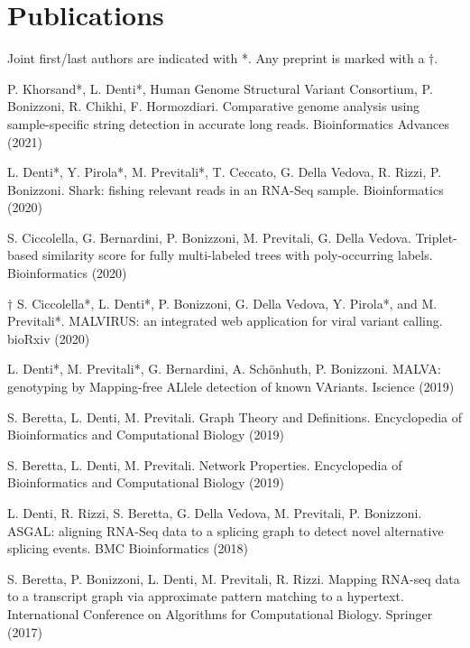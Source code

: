 \documentclass[letterpaper,11pt]{article}
\begin{document}
\section{Publications}
Joint first/last authors are indicated with *. Any preprint is marked with a \(\dagger\).
{\small
\begin{etaremune}
    \item P. Khorsand*, L. Denti*, Human Genome Structural Variant Consortium, P. Bonizzoni, R. Chikhi, F. Hormozdiari. Comparative genome analysis using sample-specific string detection in accurate long reads. Bioinformatics Advances (2021)

    \item L. Denti*, Y. Pirola*, M. Previtali*, T. Ceccato, G. Della Vedova, R. Rizzi, P. Bonizzoni. Shark: fishing relevant reads in an RNA-Seq sample. Bioinformatics (2020)
   
    \item S. Ciccolella, G. Bernardini, P. Bonizzoni, M. Previtali, G. Della Vedova. Triplet-based similarity score for fully multi-labeled trees with poly-occurring labels. Bioinformatics (2020)

    \item \(\dagger\) S. Ciccolella*, L. Denti*, P. Bonizzoni, G. Della Vedova, Y. Pirola*, and M. Previtali*. MALVIRUS: an integrated web application for viral variant calling. bioRxiv (2020)
   
    \item L. Denti*, M. Previtali*, G. Bernardini, A. Sch\"{o}nhuth, P. Bonizzoni. MALVA: genotyping by Mapping-free ALlele detection of known VAriants. Iscience (2019)
   
    \item S. Beretta, L. Denti, M. Previtali. Graph Theory and Definitions. Encyclopedia of Bioinformatics and Computational Biology (2019)
   
    \item S. Beretta, L. Denti, M. Previtali. Network Properties. Encyclopedia of Bioinformatics and Computational Biology (2019)
   
    \item L. Denti, R. Rizzi, S. Beretta, G. Della Vedova, M. Previtali, P. Bonizzoni. ASGAL: aligning RNA-Seq data to a splicing graph to detect novel alternative splicing events. BMC Bioinformatics (2018)
    
    \item S. Beretta, P. Bonizzoni, L. Denti, M. Previtali, R. Rizzi. Mapping RNA-seq data to a transcript graph via approximate pattern matching to a hypertext. International Conference on Algorithms for Computational Biology. Springer (2017)
\end{etaremune}
}
\end{document}
